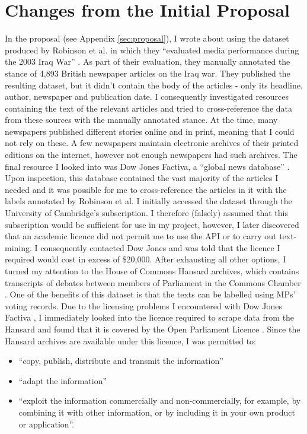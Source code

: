 \documentclass[12pt,a4paper,twoside,openright]{report}
\begin{document}
\section{Changes from the Initial Proposal} \label{prep-changes}
In the proposal (see Appendix \ref{sec:proposal}), I wrote about using the dataset produced by Robinson et al. in which they ``evaluated media performance during the 2003 Iraq War'' \cite{iraq_media_study}. As part of their evaluation, they manually annotated the stance of 4,893 British newspaper articles on the Iraq war. They published the resulting dataset, but it didn't contain the body of the articles - only its headline, author, newspaper and publication date. I consequently investigated resources containing the text of the relevant articles and tried to cross-reference the data from these sources with the manually annotated stance. At the time, many newspapers published different stories online and in print, meaning that I could not rely on these. A few newspapers maintain electronic archives of their printed editions on the internet, however not enough newspapers had such archives. The final resource I looked into was Dow Jones Factiva, a ``global news database'' \cite{factiva}. Upon inspection, this database contained the vast majority of the articles I needed and it was possible for me to cross-reference the articles in it with the labels annotated by Robinson et al. I initially accessed the dataset through the University of Cambridge's subscription. I therefore (falsely) assumed that this subscription would be sufficient for use in my project, however, I later discovered that an academic licence did not permit me to use the API or to carry out text-mining. I consequently contacted Dow Jones and was told that the licence I required would cost in excess of \$20,000.
\newline
\newline
After exhausting all other options, I turned my attention to the House of Commons Hansard archives, which contains transcripts of debates between members of Parliament in the Commons Chamber \cite{hansard}. One of the benefits of this dataset is that the texts can be labelled using MPs' voting records.
\newline
\newline
Due to the licensing problems I encountered with Dow Jones Factiva \cite{factiva}, I immediately looked into the licence required to scrape data from the Hansard and found that it is covered by the Open Parliament Licence \cite{open_parliament_licence}. Since the Hansard archives are available under this licence, I was permitted to:
\begin{itemize}
	\item ``copy, publish, distribute and transmit the information''
	\item ``adapt the information''
	\item ``exploit the information commercially and non-commercially, for example, by combining it with other information, or by including it in your own product or application''.
\end{itemize}
\end{document}
